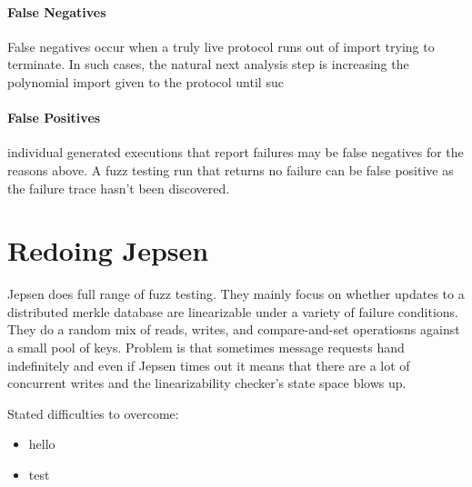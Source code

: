 \paragraph{False Negatives}
False negatives occur when a truly live protocol runs out of import trying to terminate. 
In such cases, the natural next analysis step is increasing the polynomial import given
to the protocol until suc 

\paragraph{False Positives}
individual generated executions that report failures may be false negatives for the reasons above.
A fuzz testing run that returns no failure can be false positive as the failure trace hasn't been discovered. 




\section{Redoing Jepsen}
Jepsen does full range of fuzz testing. 
They mainly focus on whether updates to a distributed merkle database are linearizable under a variety of failure conditions.
They do a random mix of reads, writes, and compare-and-set operatiosns against a small pool of keys.
Problem is that sometimes message requests hand indefinitely and even if Jepsen times out it means that there are a lot of concurrent writes and the linearizability checker's state space blows up.


Stated difficulties to overcome:
\begin{itemize}
	\item hello
	\item test
\end{itemize}

